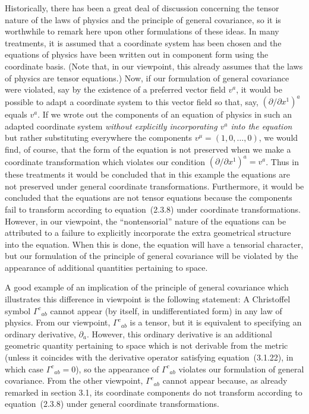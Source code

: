 Historically, there has been a great deal of discussion concerning the tensor
nature of the laws of physics and the principle of general covariance, so it is
worthwhile to remark here upon other formulations of these ideas. In many
treatments, it is assumed that a coordinate system has been chosen and the
equations of physics have been written out in component form using the coordinate
basis. (Note that, in our viewpoint, this already assumes that the laws of physics
are tensor equations.) Now, if our formulation of general covariance were
violated, say by the existence of a preferred vector field \(v^a\), it would be
possible to adapt a coordinate system to this vector field so that, say,
\((\partial/\partial x^1)^a\) equals \(v^a\). If we wrote out the components
of an equation of physics in such an adapted coordinate system
\emph{without explicitly incorporating \(v^a\) into the equation} but rather
substituting everywhere the components \(v^\mu=(1,0,\ldots,0)\), we would
find, of course, that the form of the equation is not preserved when we make a
coordinate transformation which violates our condition
\((\partial/\partial x^1)^a=v^a\). Thus in these treatments it would be
concluded that in this example the equations are not preserved under general
coordinate transformations. Furthermore, it would be concluded that the equations
are not tensor equations because the components fail to transform according to
equation~(2.3.8) under coordinate transformations. However, in our viewpoint,
the \textquotedblleft nontensorial\textquotedblright{} nature of the equations can
be attributed to a failure to explicitly incorporate the extra geometrical structure
into the equation. When this is done, the equation will have a tensorial character,
but our formulation of the principle of general covariance will be violated by the
appearance of additional quantities pertaining to space.

A good example of an implication of the principle of general covariance which
illustrates this difference in viewpoint is the following statement: A Christoffel
symbol \(\Gamma^c{}_{ab}\) cannot appear (by itself, in undifferentiated form) in
any law of physics. From our viewpoint, \(\Gamma^c{}_{ab}\) is a tensor, but it
is equivalent to specifying an ordinary derivative, \(\partial_a\). However, this
ordinary derivative is an additional geometric quantity pertaining to space which
is not derivable from the metric (unless it coincides with the derivative operator
satisfying equation~(3.1.22), in which case \(\Gamma^c{}_{ab}=0\)), so the
appearance of \(\Gamma^c{}_{ab}\) violates our formulation of general
covariance. From the other viewpoint, \(\Gamma^c{}_{ab}\) cannot appear
because, as already remarked in section 3.1, its coordinate components do not
transform according to equation~(2.3.8) under general coordinate
transformations.

